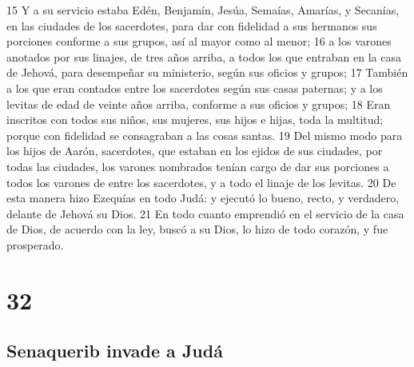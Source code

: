 15 Y a su servicio estaba Edén, Benjamín, Jesúa, Semaías, Amarías, y Secanías, en las ciudades de los sacerdotes, para dar con fidelidad a sus hermanos sus porciones conforme a sus grupos, así al mayor como al menor;
16 a los varones anotados por sus linajes, de tres años arriba, a todos los que entraban en la casa de Jehová, para desempeñar su ministerio, según sus oficios y grupos;
17 También a los que eran contados entre los sacerdotes según sus casas paternas; y a los levitas de edad de veinte años arriba, conforme a sus oficios y grupos;
18 Eran inscritos con todos sus niños, sus mujeres, sus hijos e hijas, toda la multitud; porque con fidelidad se consagraban a las cosas santas.
19 Del mismo modo para los hijos de Aarón, sacerdotes, que estaban en los ejidos de sus ciudades, por todas las ciudades, los varones nombrados tenían cargo de dar sus porciones a todos los varones de entre los sacerdotes, y a todo el linaje de los levitas.
20 De esta manera hizo Ezequías en todo Judá: y ejecutó lo bueno, recto, y verdadero, delante de Jehová su Dios.
21 En todo cuanto emprendió en el servicio de la casa de Dios, de acuerdo con la ley, buscó a su Dios, lo hizo de todo corazón, y fue prosperado.

\chapter{32}

\section*{Senaquerib invade a Judá }

 

